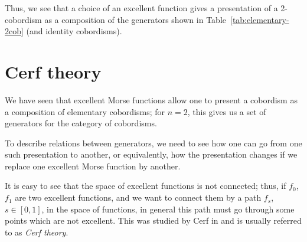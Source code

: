 Thus, we see that a choice of an excellent function gives a presentation of a
2-cobordism as a composition of the generators shown in
Table~\ref{tab:elementary-2cob} (and identity cobordisms).

\section{Cerf theory}\label{s:cerf}

We have seen that excellent Morse functions allow one to present a cobordism as
a composition of elementary cobordisms; for $n=2$, this gives us a set of
generators for the category of cobordisms.



To describe relations between generators, we need to see how one can go from
one such presentation to another, or equivalently, how the presentation changes
if we replace one excellent Morse function by another.

It is easy to see that the space of excellent functions is not connected; thus,
if $f_0$, $f_1$ are two excellent functions, and we want to connect them by a
path $f_s$, $s\in [0,1]$, in the space of functions, in general this path must
go through some points which are not excellent. This was studied by Cerf in
\cite{cerf} and is usually referred to as \emph{Cerf theory}.

